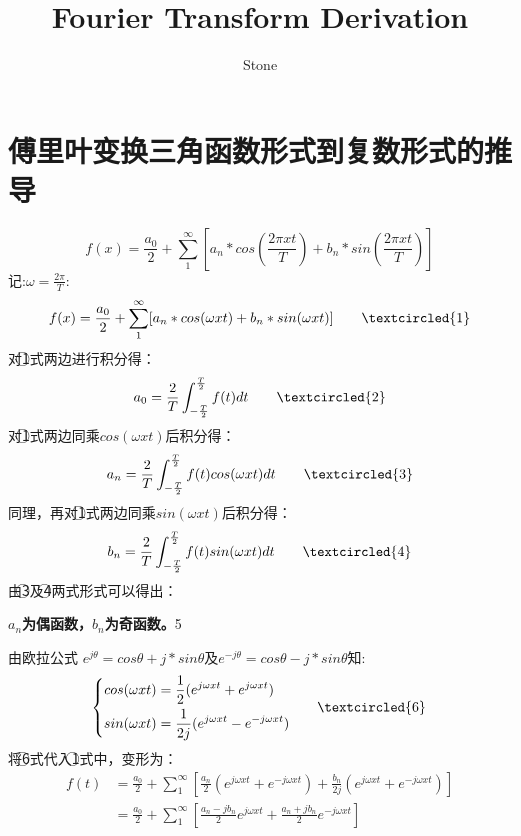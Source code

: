 \documentclass[UTF8]{article}
\author{Stone}
\title{Fourier Transform Derivation}
\begin{document}
\maketitle
\section{傅里叶变换三角函数形式到复数形式的推导}

\begin{displaymath}
  f(x) = \frac{a_{0}}{2} +
  \sum_{1}^{\infty}[a_{n}*cos(\frac{2\pi xt}{T}) +
  b_{n}*sin(\frac{2\pi xt}{T})]
\end{displaymath}
记:$
\omega = \frac{2\pi}{T}
$:
\begin{displaymath}
  f(x) = \frac{a_{0}}{2} +
  \sum_{1}^{\infty}[a_{n}*cos(\omega xt) +
  b_{n}*sin(\omega xt)]\qquad \textcircled{1}
\end{displaymath}
对\textcircled{1}式两边进行积分得：
\begin{displaymath}
  a_{0} = \frac{2}{T}\int_{-\frac{T}{2}}^{\frac{T}{2}}f(t)dt \qquad \textcircled{2}
\end{displaymath}
对\textcircled{1}式两边同乘$cos(\omega xt)$后积分得：
\begin{displaymath}
  a_{n} = \frac{2}{T}\int_{-\frac{T}{2}}^{\frac{T}{2}}f(t)cos(\omega xt)dt \qquad \textcircled{3}
\end{displaymath}
同理，再对\textcircled{1}式两边同乘$sin(\omega xt)$后积分得：
\begin{displaymath}
  b_{n} = \frac{2}{T}\int_{-\frac{T}{2}}^{\frac{T}{2}}f(t)sin(\omega xt)dt \qquad \textcircled{4}
\end{displaymath}
由\textcircled{3}及\textcircled{4}两式形式可以得出：
\\ \begin{center}
           \textbf{$a_{n}$为偶函数，$b_{n}$为奇函数。\qquad}\textcircled{5}
         \end{center}
由欧拉公式 $e^{j\theta} = cos\theta + j*sin\theta$及$ e^{-j\theta} = cos\theta - j*sin\theta$知:
$$ \left\{
\begin{aligned}
cos(\omega xt) &= \frac{1}{2}(e^{j\omega xt} + e^{j\omega xt}) \\
sin(\omega xt) &= \frac{1}{2j}(e^{j\omega xt} - e^{-j\omega xt})
\end{aligned} \qquad \textcircled{6}
\right.
$$
将\textcircled{6}式代入\textcircled{1}式中，变形为：
\begin{displaymath}
  \begin{aligned}
  f(t) &= \frac{a_{0}}{2} + \sum_{1}^{\infty}[
  \frac{a_{n}}{2}(e^{j\omega xt} + e^{-j\omega xt}) +
  \frac{b_{n}}{2j}(e^{j\omega xt} + e^{-j\omega xt})]
  \\&= \frac{a_{0}}{2} + \sum_{1}^{\infty}[
  \frac{a_{n}-j b_{n}}{2}e^{j\omega xt}+
  \frac{a_{n}+j b_{n}}{2}e^{-j\omega xt}]
  \end{aligned}  
\end{displaymath}
\end{document}
